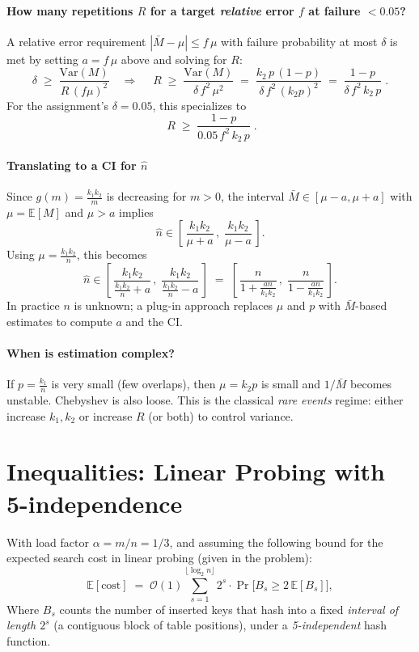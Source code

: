 \paragraph{How many repetitions $R$ for a target \emph{relative} error $f$ at failure $<0.05$?}
A relative error requirement $|\bar M-\mu|\le f\,\mu$ with failure probability at most $\delta$ is met by setting $a=f\,\mu$ above and solving for $R$:
\[
\delta \;\ge\; \frac{\mathrm{Var}(M)}{R\,(f\mu)^2}
\quad\Longrightarrow\quad
\boxed{\;
R \;\ge\; \frac{\mathrm{Var}(M)}{\delta\,f^2\,\mu^2}
\;=\; \frac{k_2\,p\,(1-p)}{\delta\,f^2\,(k_2 p)^2}
\;=\; \frac{1-p}{\delta\,f^2\,k_2\,p}\;}.
\]
For the assignment’s $\delta=0.05$, this specializes to
\[
\boxed{\; R \;\ge\; \dfrac{1-p}{0.05\,f^2\,k_2\,p}\; }.
\]


\paragraph{Translating to a CI for \(\hat{n}\)}
Since \(g(m)=\frac{k_1 k_2}{m}\) is decreasing for \(m>0\), the interval
\(\bar{M}\in[\mu-a,\mu+a]\) with \(\mu=\mathbb{E}[M]\) and \(\mu>a\) implies
\[
  \hat{n} \in
  \left[\, \frac{k_1 k_2}{\mu+a}\,,\; \frac{k_1 k_2}{\mu-a}\,\right].
\]
Using \( \mu=\frac{k_1 k_2}{n}\), this becomes
\[
  \hat{n} \in 
  \left[\, \frac{k_1 k_2}{\frac{k_1 k_2}{n}+a}\,,\; \frac{k_1 k_2}{\frac{k_1 k_2}{n}-a}\,\right]
  \;=\;
  \left[\, \frac{n}{1 + \frac{a n}{k_1 k_2}}\,,\; \frac{n}{1 - \frac{a n}{k_1 k_2}}\,\right].
\]
In practice \(n\) is unknown; a plug-in approach replaces \(\mu\) and \(p\) with \(\bar{M}\)-based estimates to compute \(a\) and the CI.

\paragraph{When is estimation complex?}
If \(p=\frac{k_1}{n}\) is very small (few overlaps), then \(\mu=k_2p\) is small and \(1/\bar{M}\) becomes unstable.
Chebyshev is also loose. This is the classical \emph{rare events} regime: either increase \(k_1,k_2\) or increase \(R\) (or both) to control variance.

\newpage

\section{Inequalities: Linear Probing with 5-independence}
With load factor \(\alpha=m/n=1/3\), and assuming the following bound for the expected search cost in linear probing (given in the problem):
\[
  \mathbb{E}[\text{cost}] \;=\; \mathcal{O}(1)\sum_{s=1}^{\lfloor \log_2 n \rfloor} 2^s \cdot \Pr\big[B_s \ge 2\,\mathbb{E}[B_s]\big],
\]
Where \(B_s\) counts the number of inserted keys that hash into a fixed \emph{interval of length \(2^s\)} (a contiguous block of table positions), under a \emph{5-independent} hash function.

